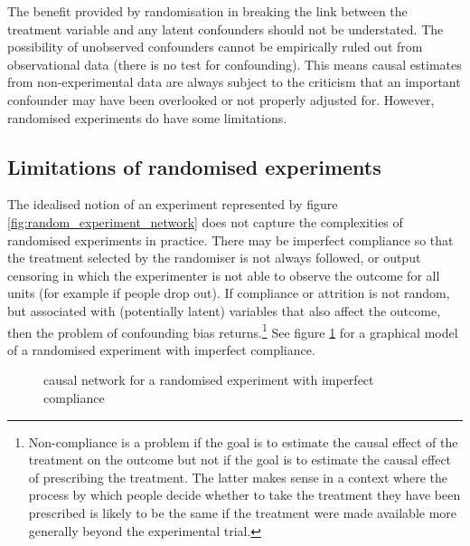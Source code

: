 \documentclass[11pt,a4paper,twoside]{report}
\theoremstyle{plain}
\theoremstyle{definition}
\begin{document}
The benefit provided by randomisation in breaking the link between the treatment variable and any latent confounders should not be understated. The possibility of unobserved confounders cannot be empirically ruled out from observational data \citep{Pearl2000} (there is no test for confounding). This means causal estimates from non-experimental data are always subject to the criticism that an important confounder may have been overlooked or not properly adjusted for. However, randomised experiments do have some limitations. 

\subsection{Limitations of randomised experiments}
\label{subsec:limitations_of_experiment}

The idealised notion of an experiment represented by figure \ref{fig:random_experiment_network} does not capture the complexities of randomised experiments in practice. There may be imperfect compliance so that the treatment selected by the randomiser is not always followed, or output censoring in which the experimenter is not able to observe the outcome for all units (for example if people drop out). If compliance or attrition is not random, but associated with (potentially latent) variables that also affect the outcome, then the problem of confounding bias returns.\footnote{Non-compliance is a problem if the goal is to estimate the causal effect of the treatment on the outcome but not if the goal is to estimate the causal effect of prescribing the treatment. The latter makes sense in a context where the process by which people decide whether to take the treatment they have been prescribed is likely to be the same if the treatment were made available more generally beyond the experimental trial.} See figure \ref{fig:random_experiment_network_imperfect_compliance} for a graphical model of a randomised experiment with imperfect compliance.

\begin{figure}
\centering
{}
\caption{causal network for a randomised experiment with imperfect compliance}
\label{fig:random_experiment_network_imperfect_compliance}
\end{figure} 
\end{document}
